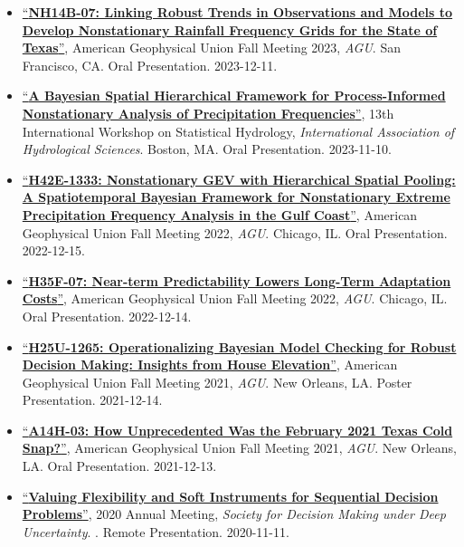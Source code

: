 \documentclass[10pt,oneside]{article}
\begin{document}
\begin{itemize}[label={}]
  \item \href{https://agu.confex.com/agu/fm23/meetingapp.cgi/Paper/1352809}{\enquote{\textbf{NH14B-07: Linking Robust Trends in Observations and Models to Develop Nonstationary Rainfall Frequency Grids for the State of Texas}}}, American Geophysical Union Fall Meeting 2023,  \textit{AGU}. San Francisco, CA. Oral Presentation. 2023-12-11.
  
  \item \href{https://iahs.info/uploads/Commissions/ICSH/STAHY%202023%20Program%20Public.pdf}{\enquote{\textbf{A Bayesian Spatial Hierarchical Framework for Process-Informed Nonstationary Analysis of Precipitation Frequencies}}}, 13th International Workshop on Statistical Hydrology,  \textit{International Association of Hydrological Sciences}. Boston, MA. Oral Presentation. 2023-11-10.
  
  \item \href{https://agu.confex.com/agu/fm22/meetingapp.cgi/Paper/1136415}{\enquote{\textbf{H42E-1333: Nonstationary GEV with Hierarchical Spatial Pooling: A Spatiotemporal Bayesian Framework for Nonstationary Extreme Precipitation Frequency Analysis in the Gulf Coast}}}, American Geophysical Union Fall Meeting 2022,  \textit{AGU}. Chicago, IL. Oral Presentation. 2022-12-15.
  
  \item \href{https://agu.confex.com/agu/fm22/meetingapp.cgi/Paper/1153913}{\enquote{\textbf{H35F-07: Near-term Predictability Lowers Long-Term Adaptation Costs}}}, American Geophysical Union Fall Meeting 2022,  \textit{AGU}. Chicago, IL. Oral Presentation. 2022-12-14.
  
  \item \href{agu2021fallmeeting-agu.ipostersessions.com/Default.aspx?s=D2-0D-CF-34-C4-B0-81-F3-7F-89-98-D7-10-3D-BB-01}{\enquote{\textbf{H25U-1265: Operationalizing Bayesian Model Checking for Robust Decision Making: Insights from House Elevation}}}, American Geophysical Union Fall Meeting 2021,  \textit{AGU}. New Orleans, LA. Poster Presentation. 2021-12-14.
  
  \item \href{https://agu.confex.com/agu/fm21/meetingapp.cgi/Paper/796322}{\enquote{\textbf{A14H-03: How Unprecedented Was the February 2021 Texas Cold Snap?}}}, American Geophysical Union Fall Meeting 2021,  \textit{AGU}. New Orleans, LA. Oral Presentation. 2021-12-13.
  
  \item \href{https://2020.deepuncertainty.org/program}{\enquote{\textbf{Valuing Flexibility and Soft Instruments for Sequential Decision Problems}}}, 2020 Annual Meeting,  \textit{Society for Decision Making under Deep Uncertainty}. . Remote Presentation. 2020-11-11.
  

\end{itemize}
\end{document}
